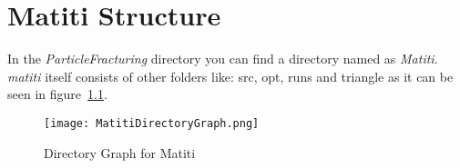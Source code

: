 \documentclass[11pt,fleqn]{book} %
\begin{document}
  \pagestyle{empty} %
  \tableofcontents %
  \cleardoublepage %
  \pagestyle{fancy} %

\setlength{\parindent}{5pt}
\setlength{\parskip}{5pt}

\chapter{Matiti Structure} 
\label{sec:MatitiStructure} 
In the \emph{ParticleFracturing} directory you can find a directory named as \emph{Matiti}. \emph{matiti} itself consists of other folders like: src, opt, runs and triangle as it can be seen in figure~\ref{fig:MatitiDirectoryGraph}.
\begin{figure}
  \texttt{[image: MatitiDirectoryGraph.png]}
  \caption{Directory Graph for Matiti}
  \label{fig:MatitiDirectoryGraph}
\end{figure}
\end{document}
